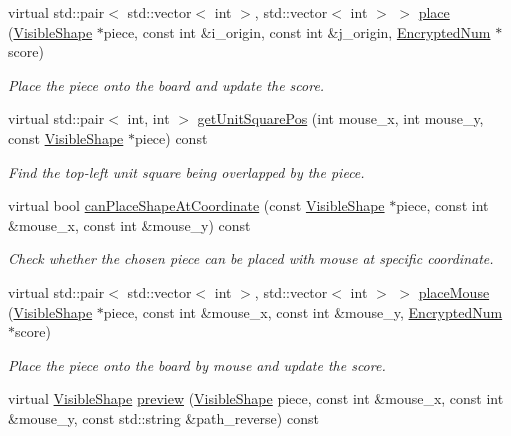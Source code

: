 \begin{DoxyCompactItemize}
virtual std\+::pair$<$ std\+::vector$<$ int $>$, std\+::vector$<$ int $>$ $>$ \mbox{\hyperlink{class_board_ab78b22b75a90d251c605d014f65bbc9a}{place}} (\mbox{\hyperlink{class_visible_shape}{Visible\+Shape}} $\ast$piece, const int \&i\+\_\+origin, const int \&j\+\_\+origin, \mbox{\hyperlink{class_encrypted_num}{Encrypted\+Num}} $\ast$score)
\begin{DoxyCompactList}\small\item\em Place the piece onto the board and update the score. \end{DoxyCompactList}\item 
virtual std\+::pair$<$ int, int $>$ \mbox{\hyperlink{class_board_a47fb67404ee45b4ad700a57e3849995b}{get\+Unit\+Square\+Pos}} (int mouse\+\_\+x, int mouse\+\_\+y, const \mbox{\hyperlink{class_visible_shape}{Visible\+Shape}} $\ast$piece) const
\begin{DoxyCompactList}\small\item\em Find the top-\/left unit square being overlapped by the piece. \end{DoxyCompactList}\item 
virtual bool \mbox{\hyperlink{class_board_aa4001c8b1e2338fa0dfed7df6f5dcb6b}{can\+Place\+Shape\+At\+Coordinate}} (const \mbox{\hyperlink{class_visible_shape}{Visible\+Shape}} $\ast$piece, const int \&mouse\+\_\+x, const int \&mouse\+\_\+y) const
\begin{DoxyCompactList}\small\item\em Check whether the chosen piece can be placed with mouse at specific coordinate. \end{DoxyCompactList}\item 
virtual std\+::pair$<$ std\+::vector$<$ int $>$, std\+::vector$<$ int $>$ $>$ \mbox{\hyperlink{class_board_a563e46d75b5050beb821cd4ba922ffc7}{place\+Mouse}} (\mbox{\hyperlink{class_visible_shape}{Visible\+Shape}} $\ast$piece, const int \&mouse\+\_\+x, const int \&mouse\+\_\+y, \mbox{\hyperlink{class_encrypted_num}{Encrypted\+Num}} $\ast$score)
\begin{DoxyCompactList}\small\item\em Place the piece onto the board by mouse and update the score. \end{DoxyCompactList}\item 
virtual \mbox{\hyperlink{class_visible_shape}{Visible\+Shape}} \mbox{\hyperlink{class_board_a51f08756175c14dd36acfcdf3b9ea356}{preview}} (\mbox{\hyperlink{class_visible_shape}{Visible\+Shape}} piece, const int \&mouse\+\_\+x, const int \&mouse\+\_\+y, const std\+::string \&path\+\_\+reverse) const

\end{DoxyCompactItemize}
